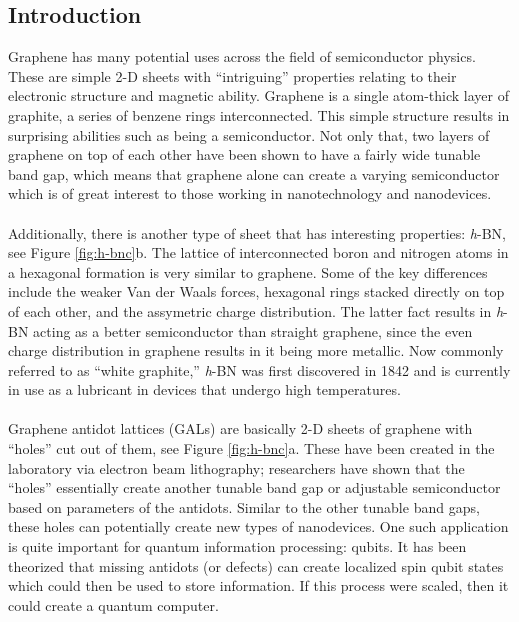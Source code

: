 \documentclass[11pt]{article}
\begin{document}
\begin{multicols}{2}
	

\section{\textbf{Introduction}}
Graphene has many potential uses across the field of semiconductor physics.\cite{main,synth,semicond,band,qubit} These are simple 2-D sheets with ``intriguing'' properties relating to their electronic structure and magnetic ability. Graphene is a single atom-thick layer of graphite, a series of benzene rings interconnected. This simple structure results in surprising abilities such as being a semiconductor.\cite{semicond} Not only that, two layers of graphene on top of each other have been shown to have a fairly wide tunable band gap,\cite{band} which means that graphene alone can create a varying semiconductor which is of great interest to those working in nanotechnology and nanodevices. \\ \\

Additionally, there is another type of sheet that has interesting properties: \textit{h}-BN, see Figure \ref{fig:h-bnc}b. The lattice of interconnected boron and nitrogen atoms in a hexagonal formation is very similar to graphene. Some of the key differences include the weaker Van der Waals forces, hexagonal rings stacked directly on top of each other, and the assymetric charge distribution.\cite{bn} The latter fact results in \textit{h}-BN acting as a better semiconductor than straight graphene, since the even charge distribution in graphene results in it being more metallic. Now commonly referred to as ``white graphite,'' \textit{h}-BN was first discovered in 1842 and is currently in use as a lubricant in devices that undergo high temperatures. \cite{bn} \\ \\

Graphene antidot lattices (GALs) are basically 2-D sheets of graphene with ``holes'' cut out of them, see Figure \ref{fig:h-bnc}a. These have been created in the laboratory via electron beam lithography; researchers have shown that the ``holes'' essentially create another tunable band gap or adjustable semiconductor based on parameters of the antidots.\cite{qubit} Similar to the other tunable band gaps, these holes can potentially create new types of nanodevices. One such application is quite important for quantum information processing: qubits. It has been theorized that missing antidots (or defects) can create localized spin qubit states which could then be used to store information. If this process were scaled, then it could create a quantum computer.\cite{qubit} \\ \\


\end{multicols}
\end{document}
